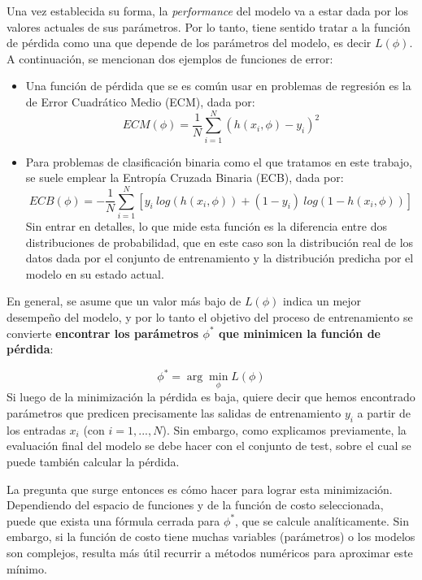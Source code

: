 \documentclass[../../main.tex]{subfiles}
\begin{document}
Una vez establecida su forma, la \textit{performance} del modelo va a estar dada por los
valores actuales de sus parámetros. Por lo tanto, tiene sentido tratar a la función de
pérdida como una que depende de los parámetros del modelo, es decir
\(L(\phi)\)\footnotemark.  A continuación, se
mencionan dos ejemplos de funciones de error:
\begin{itemize}
    \item Una función de pérdida que se es común usar en problemas de regresión es la de
    Error Cuadrático Medio (ECM), dada por:
    \[
    ECM(\phi) = \frac{1}{N} \sum_{i=1}^{N} \left(h(x_i, \phi) - y_i\right)^2
    \]
    \item Para problemas de clasificación binaria como el que tratamos en este trabajo, se
    suele emplear la Entropía Cruzada Binaria (ECB), dada por:
    \[
    ECB(\phi) = -\frac{1}{N} \sum_{i=1}^{N}
        \left[
            y_i\ log(h(x_i, \phi)) + (1 - y_i)\ log(1 - h(x_i, \phi))
        \right]
    \]
    Sin entrar en detalles, lo que mide esta función es la diferencia entre dos
    distribuciones de probabilidad, que en este caso son la distribución real de los datos
    dada por el conjunto de entrenamiento y la distribución predicha por el modelo en su
    estado actual.
\end{itemize}

En general, se asume que un valor más bajo de \(L(\phi)\) indica un mejor desempeño del
modelo, y por lo tanto el objetivo del proceso de entrenamiento se convierte
\textbf{encontrar los parámetros \(\phi^*\) que minimicen la función de pérdida}:

\[
\phi^* = \arg\min_{\phi} L(\phi)
\]
Si luego de la minimización la pérdida es baja, quiere decir que hemos encontrado
parámetros que predicen precisamente las salidas de entrenamiento \(y_i\) a partir de los
entradas \(x_i\) (con \(i=1,...,N\)). Sin embargo, como explicamos previamente, la
evaluación final del modelo se debe hacer con el conjunto de test, sobre el cual se puede
también calcular la pérdida.

La pregunta que surge entonces es cómo hacer para lograr esta minimización. Dependiendo
del espacio de funciones y de la función de costo seleccionada, puede que exista una
fórmula cerrada para \(\phi^*\), que se calcule analíticamente. Sin embargo, si la función
de costo tiene muchas variables (parámetros) o los modelos son complejos, resulta más útil
recurrir a métodos numéricos para aproximar este mínimo.
\end{document}
